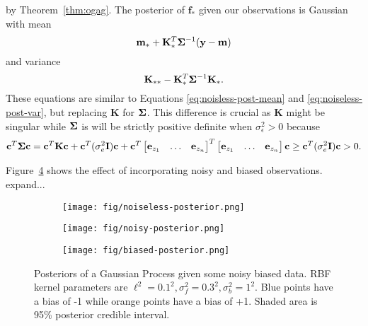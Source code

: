 by Theorem~\ref{thm:ogag}.
The posterior of $\mathbf{f}_*$ given our observations is Gaussian with mean
\begin{equation*}
    \mathbf{m}_* + \mathbf{K}_*^T \boldsymbol{\Sigma}^{-1} (\mathbf{y} - \mathbf{m})
\end{equation*}
and variance
\begin{equation*}
    \mathbf{K}_{* *} - \mathbf{K}_*^T \boldsymbol{\Sigma}^{-1} \mathbf{K}_*.
\end{equation*}
These equations are similar to Equations \ref{eq:noisless-post-mean} and \ref{eq:noiseless-post-var}, but replacing $\mathbf{K}$ for $\boldsymbol{\Sigma}$.
This difference is crucial as $\mathbf{K}$ might be singular
while $\boldsymbol{\Sigma}$ is will be strictly positive definite when $\sigma_{\epsilon}^2 > 0$ because
\begin{align*}
    \mathbf{c}^{T} \boldsymbol{\Sigma} \mathbf{c}
    = \mathbf{c}^{T} \mathbf{K} \mathbf{c}
    + \mathbf{c}^{T} (\sigma^2_e \mathbf{I}) \mathbf{c}
    +
    \mathbf{c}^{T}
    \begin{bmatrix}
        \mathbf{e}_{z_1} & \hdots & \mathbf{e}_{z_n}
    \end{bmatrix}
    ^{ T}
    \begin{bmatrix}
        \mathbf{e}_{z_1} & \hdots & \mathbf{e}_{z_n}
    \end{bmatrix}
    \mathbf{c} \geq \mathbf{c}^{T} (\sigma^2_e \mathbf{I}) \mathbf{c}
    > 0.
\end{align*}

Figure~\ref{fig:gp-posteriors} shows the effect of incorporating noisy and biased observations.
expand...

\begin{figure}
    \centering
    \begin{subfigure}[b]{0.3\textwidth}
        \centering
        \texttt{[image: fig/noiseless-posterior.png]}
        \caption{}
        \label{subfig:noiseless-post}
    \end{subfigure}
    \hfill
    \begin{subfigure}[b]{0.3\textwidth}
        \centering
        \texttt{[image: fig/noisy-posterior.png]}
        \caption{}
        \label{subfig:noisy-posterior}
    \end{subfigure}
    \hfill
    \begin{subfigure}[b]{0.3\textwidth}
        \centering
        \texttt{[image: fig/biased-posterior.png]}
        \caption{}
        \label{subfig:biased-posterior}
    \end{subfigure}
    \hfill
    \caption{Posteriors of a Gaussian Process given some noisy biased data.
    RBF kernel parameters are $\ell^{2} = 0.1^2, \sigma^2_{f} = 0.3 ^ 2, \sigma^2_b = 1^2$.
    Blue points have a bias of -1 while orange points have a bias of +1.
    Shaded area is 95\% posterior credible interval.
    }
    \label{fig:gp-posteriors}
\end{figure}
